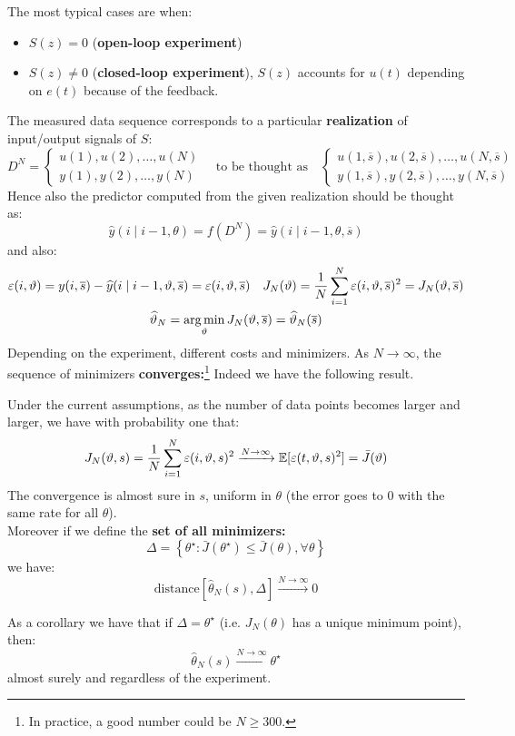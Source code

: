 The most typical cases are when:
\begin{itemize}
	\item $S(z)=0$ (\textbf{open-loop experiment})
	\item $S(z)\neq 0$ (\textbf{closed-loop experiment}), $S(z)$ accounts for $u(t)$ depending on $e(t)$ because of the feedback.
\end{itemize}
The measured data sequence corresponds to a particular \textbf{realization} of input/output signals of $S$:
\[
	D^{N}=
	\begin{cases}
	 	u(1),u(2),\ldots,u(N)\\
	 	y(1),y(2),\ldots,y(N)
	\end{cases}
	\quad
	\text{to be thought as}
	\quad
	\begin{cases}
	 	u(1,\overline{s}),u(2,\overline{s}),\ldots,u(N,\overline{s})\\
	 	y(1,\overline{s}),y(2,\overline{s}),\ldots,y(N,\overline{s})
	\end{cases}
\]
Hence also the predictor computed from the given realization should be thought as:
\[
	\hat{y}(i\mid i-1,\theta) = f(D^{N}) = \hat{y}(i\mid i-1,\theta,\overline{s})
\]
and also:
\begin{gather*}
	\varepsilon(i,\vartheta) = y(i,\overline{s}) - \widehat{y}(i\mid i-1,\vartheta,\overline{s}) = \varepsilon(i,\vartheta,\overline{s})
	\quad
	J_{N}(\vartheta) = \frac{1}{N}\sum_{i=1}^{N} \varepsilon(i,\vartheta,\overline{s})^2 = J_{N}(\vartheta,\overline{s})\\
	\widehat{\vartheta}_{N} = \operatorname*{arg\,min}_{\vartheta} J_{N}(\vartheta,\overline{s}) = \widehat{\vartheta}_{N}(\overline{s})
\end{gather*}
Depending on the experiment, different costs and minimizers. As $N\to \infty$, the sequence of minimizers \textbf{converges:}\footnote{In practice, a good number could be $N\geq 300$.}
Indeed we have the following result.
\begin{theorem}
	Under the current assumptions, as the number of data points becomes larger and larger, we have with probability one that:
	\[
		J_{N}(\vartheta,s) = \frac{1}{N}\sum_{i=1}^{N} \varepsilon(i,\vartheta,s)^2 \xrightarrow{N\to\infty} \mathbb{E}[\varepsilon(t,\vartheta,s)^2] = \bar{J}(\vartheta)
	\]
	The convergence is almost sure in $s$, uniform in $\theta$ (the error goes to $0$ with the same rate for all $\theta$).\\
	Moreover if we define the \textbf{set of all minimizers:}
	\[
		\Delta = \left\{ \theta ^{\star} : \bar{J}(\theta ^{\star})\leq \bar{J}(\theta),\forall \theta  \right\}
	\]
	we have:
	\[
		\text{distance}[\hat{\theta}_{N}(s), \Delta]\xrightarrow{N\to\infty} 0
	\]
\end{theorem}
As a corollary we have that if $\Delta ={\theta ^{\star} }$ (i.e. $J_{N}(\theta)$ has a unique minimum point), then:
\[
	\hat{\theta}_{N}(s) \xrightarrow{N\to\infty} \theta ^{\star} 
\]
almost surely and regardless of the experiment.

